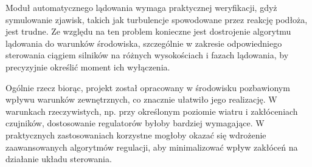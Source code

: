 \documentclass[polish,11pt,a4paper]{article}
\begin{document}
Moduł automatycznego lądowania wymaga praktycznej weryfikacji, gdyż symulowanie
 zjawisk, takich jak turbulencje spowodowane przez reakcję podłoża, jest trudne.
  Ze względu na ten problem konieczne jest dostrojenie algorytmu lądowania do warunków
   środowiska, szczególnie w zakresie odpowiedniego sterowania ciągiem silników na różnych
    wysokościach i fazach lądowania, by precyzyjnie określić moment ich wyłączenia.

Ogólnie rzecz biorąc, projekt został opracowany w środowisku pozbawionym wpływu
 warunków zewnętrznych, co znacznie ułatwiło jego realizację. W warunkach rzeczywistych,
  np. przy określonym poziomie wiatru i zakłóceniach czujników, dostosowanie regulatorów
   byłoby bardziej wymagające. W praktycznych zastosowaniach korzystne mogłoby okazać się 
   wdrożenie zaawansowanych algorytmów regulacji, aby minimalizować wpływ zakłóceń na działanie 
   układu sterowania.
\end{document}
